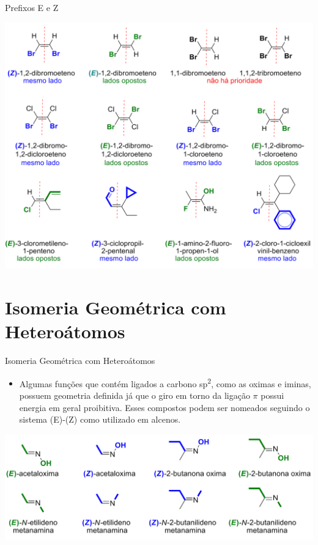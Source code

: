 \documentclass[presentation,professionalfonts,aspectratio=169]{beamer}
\begin{document}
\begin{frame}[allowframebreaks]{Prefixos E e Z}
\framebreak

\begin{center}
\includegraphics[scale=0.22]{QO/Isomeria/org_ez.png}
\end{center}
\end{frame}

\section{Isomeria Geométrica com Heteroátomos}
\label{sec:org101c668}

\begin{frame}[label={sec:org83b5884}]{Isomeria Geométrica com Heteroátomos}
\begin{itemize}
\item Algumas funções que contém ligados a carbono sp\textsuperscript{2}, como as oximas e iminas, possuem geometria definida já que o giro em torno da ligação \(\pi\) possui energia em geral proibitiva. Esses compostos podem ser nomeados seguindo o sistema (\alert{E})-(\alert{Z}) como utilizado em alcenos.
\end{itemize}

\begin{center}
\includegraphics[width=.9\linewidth]{QO/Isomeria/org_ez_hetero.png}
\end{center}
\end{frame}
\end{document}
